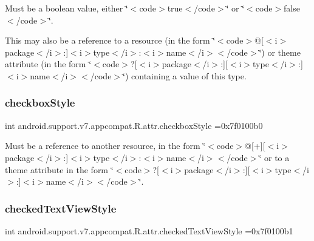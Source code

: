 Must be a boolean value, either \char`\"{}$<$code$>$true$<$/code$>$\char`\"{} or \char`\"{}$<$code$>$false$<$/code$>$\char`\"{}. 

This may also be a reference to a resource (in the form \char`\"{}$<$code$>$@\mbox{[}$<$i$>$package$<$/i$>$\+:\mbox{]}$<$i$>$type$<$/i$>$\+:$<$i$>$name$<$/i$>$$<$/code$>$\char`\"{}) or theme attribute (in the form \char`\"{}$<$code$>$?\mbox{[}$<$i$>$package$<$/i$>$\+:\mbox{]}\mbox{[}$<$i$>$type$<$/i$>$\+:\mbox{]}$<$i$>$name$<$/i$>$$<$/code$>$\char`\"{}) containing a value of this type. \mbox{\label{classandroid_1_1support_1_1v7_1_1appcompat_1_1R_1_1attr_a8e18e9577e5b537ba3d5390332c30018}} 
\subsubsection{\texorpdfstring{checkbox\+Style}{checkboxStyle}}
{\footnotesize\ttfamily int android.\+support.\+v7.\+appcompat.\+R.\+attr.\+checkbox\+Style =0x7f0100b0\hspace{0.3cm}{\ttfamily [static]}}

Must be a reference to another resource, in the form \char`\"{}$<$code$>$@\mbox{[}+\mbox{]}\mbox{[}$<$i$>$package$<$/i$>$\+:\mbox{]}$<$i$>$type$<$/i$>$\+:$<$i$>$name$<$/i$>$$<$/code$>$\char`\"{} or to a theme attribute in the form \char`\"{}$<$code$>$?\mbox{[}$<$i$>$package$<$/i$>$\+:\mbox{]}\mbox{[}$<$i$>$type$<$/i$>$\+:\mbox{]}$<$i$>$name$<$/i$>$$<$/code$>$\char`\"{}. \mbox{\label{classandroid_1_1support_1_1v7_1_1appcompat_1_1R_1_1attr_a042cf45307b147fc815136c31ed243eb}} 
\subsubsection{\texorpdfstring{checked\+Text\+View\+Style}{checkedTextViewStyle}}
{\footnotesize\ttfamily int android.\+support.\+v7.\+appcompat.\+R.\+attr.\+checked\+Text\+View\+Style =0x7f0100b1\hspace{0.3cm}{\ttfamily [static]}}

